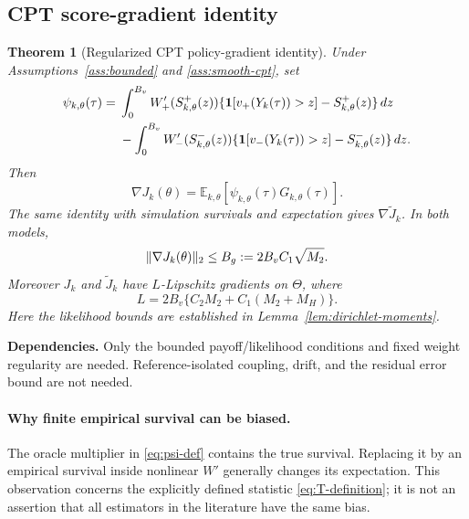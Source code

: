 \documentclass[11pt]{article}
\newtheorem{theorem}{Theorem}[section]
\newcommand{\E}{\mathbb E}
\newcommand{\1}{\mathbf 1}
\DeclarePairedDelimiter{\norm}{\lVert}{\rVert}
\theoremstyle{definition}
\newcommand{\dependson}[1]{\par\noindent\textbf{Dependencies.} #1\par\smallskip}
\begin{document}
\subsection{CPT score-gradient identity}
\begin{theorem}[Regularized CPT policy-gradient identity]\label{thm:gradient-identity}
Under Assumptions~\ref{ass:bounded} and \ref{ass:smooth-cpt}, set
\begin{align}\label{eq:psi-def}
 \psi_{k,\theta}(\tau)
 ={}&\int_0^{B_v}W_+'(S_{k,\theta}^+(z))
 \{\1[v_+(Y_k(\tau))>z]-S_{k,\theta}^+(z)\}\,dz\notag\\
 &-\int_0^{B_v}W_-'(S_{k,\theta}^-(z))
 \{\1[v_-(Y_k(\tau))>z]-S_{k,\theta}^-(z)\}\,dz.
\end{align}
Then
\begin{equation}\label{eq:gradient-identity}
 \nabla J_k(\theta)=\E_{k,\theta}[\psi_{k,\theta}(\tau)G_{k,\theta}(\tau)].
\end{equation}
The same identity with simulation survivals and expectation gives $\nabla\widetilde J_k$. In both models,
\begin{equation}\label{eq:gradient-bound}
 \norm{\nabla J_k(\theta)}_2\le B_g:=2B_vC_1\sqrt{M_2}.
\end{equation}
Moreover $J_k$ and $\widetilde J_k$ have $L$-Lipschitz gradients on $\Theta$, where
\begin{equation}\label{eq:derived-smoothness}
 L=2B_v\{C_2M_2+C_1(M_2+M_H)\}.
\end{equation}
Here the likelihood bounds are established in Lemma~\ref{lem:dirichlet-moments}.
\end{theorem}
\dependson{Only the bounded payoff/likelihood conditions and fixed weight regularity are needed. Reference-isolated coupling, drift, and the residual error bound are not needed.}

\paragraph{Why finite empirical survival can be biased.}
The oracle multiplier in \eqref{eq:psi-def} contains the true survival. Replacing it by an empirical survival inside nonlinear $W'$ generally changes its expectation. This observation concerns the explicitly defined statistic \eqref{eq:T-definition}; it is not an assertion that all estimators in the literature have the same bias.
\end{document}
